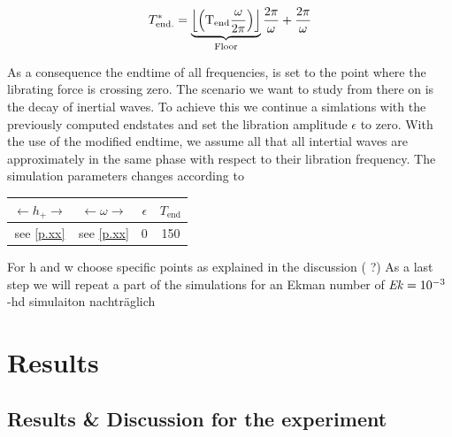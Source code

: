 \begin{align}
    T_{\text{end.}}^* = \underbrace{\Bigl\lfloor\left(\text{T}_{\text{end}}\frac{\omega}{2\pi}\right)\Bigr\rfloor}_{
        \text{Floor}
        }\frac{2\pi}{\omega} + \frac{2\pi}{\omega}
\end{align}

As a consequence the endtime  of all frequencies, is set to the point where the librating force is crossing zero.
The scenario we want to study from there on is the decay of inertial waves.
To achieve this we continue a simlations with the previously computed endstates and set the libration amplitude $\epsilon$ to zero.
With the use of the modified endtime, we assume all that all intertial waves are
approximately in the same phase with respect to their libration frequency.
The simulation parameters changes according to

\begin{center}
\vspace*{0.7ex}
\begin{tabular}{c|c|c|c}
$\leftarrow h_+ \rightarrow$ & $ \leftarrow  \omega \rightarrow $ & $\epsilon$ & $T_{\text{end}}$\\
\hline
 see \ref{p.xx} & see \ref{p.xx} & 0 & 150\\
\end{tabular}
\vspace*{0.7ex}
\end{center}

For h and w choose specific points as explained in the discussion ( ?)
As a last step we will repeat a part of the simulations for an Ekman number of $\mbox{\textit{Ek}} = 10^{-3}$
-hd simulaiton nachträglich

\clearpage

\section{Results}
\subsection{Results \& Discussion for the experiment}
\label{cone:exp}

